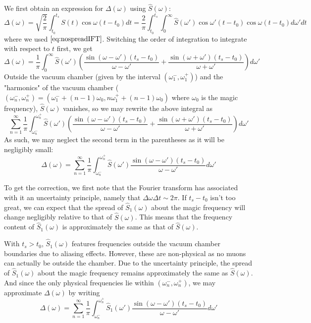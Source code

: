 We first obtain an expression for $\Delta(\omega)$ using $\hat{S}(\omega)$: \[\Delta(\omega)=\sqrt{\frac{2}{\pi}}\int^{t_s}_{t_0}S(t)\cos\omega(t-t_0)dt=\frac{2}{\pi}\int^{t_s}_{t_0}\int^{\infty}_0\hat{S}(\omega')\cos\omega'(t-t_0)\cos\omega(t-t_0)d\omega'dt\] where we used$~\eqref{eq:nospreadIFT}$. Switching the order of integration to integrate with respect to $t$ first, we get \[\Delta(\omega)=\frac{1}{\pi}\int^{\infty}_0\hat{S}(\omega')\left(\frac{\sin(\omega-\omega')(t_s-t_0)}{\omega-\omega'}+\frac{\sin(\omega+\omega')(t_s-t_0)}{\omega+\omega'}\right)d\omega'\] Outside the vacuum chamber (given by the interval $(\omega^-_1,\omega^+_1)$) and the "harmonics" of the vacuum chamber ($(\omega^-_n,\omega^+_n)=(\omega^-_1+(n-1)\omega_0,n\omega^+_1+(n-1)\omega_0)$ where $\omega_0$ is the magic frequency), $\hat{S}(\omega)$ vanishes, so we may rewrite the above integral as \[\sum^{\infty}_{n=1}\frac{1}{\pi}\int^{\omega^+_n}_{\omega^-_n}\hat{S}(\omega')\left(\frac{\sin(\omega-\omega')(t_s-t_0)}{\omega-\omega'}+\frac{\sin(\omega+\omega')(t_s-t_0)}{\omega+\omega'}\right)d\omega'\] As such, we may neglect the second term in the parentheses as it will be negligibly small: \[\Delta(\omega)=\sum^{\infty}_{n=1}\frac{1}{\pi}\int^{\omega^+_n}_{\omega^-_n}\hat{S}(\omega')\frac{\sin(\omega-\omega')(t_s-t_0)}{\omega-\omega'}d\omega'\]

To get the correction, we first note that the Fourier transform has associated with it an uncertainty principle, namely that $\Delta\omega\Delta t\sim2\pi$. If $t_s-t_0$ isn't too great, we can expect that the spread of $\hat{S}_1(\omega)$ about the magic frequency will change negligibly relative to that of $\hat{S}(\omega)$. This means that the frequency content of $\hat{S}_1(\omega)$ is approximately the same as that of $\hat{S}(\omega)$.

With $t_s>t_0$, $\hat{S}_1(\omega)$ features frequencies outside the vacuum chamber boundaries due to aliasing effects. However, these are non-physical as no muons can actually be outside the chamber. Due to the uncertainty principle, the spread of $\hat{S}_1(\omega)$ about the magic frequency remains approximately the same as $\hat{S}(\omega)$. And since the only physical frequencies lie within $(\omega^-_n,\omega^+_n)$, we may approximate $\Delta(\omega)$ by writing 
\begin{equation}
\Delta(\omega)=\sum^{\infty}_{n=1}\frac{1}{\pi}\int^{\omega^+_n}_{\omega^-_n}\hat{S}_1(\omega')\frac{\sin(\omega-\omega')(t_s-t_0)}{\omega-\omega'}d\omega'
\label{eq:OrlovDelta}
\end{equation}

